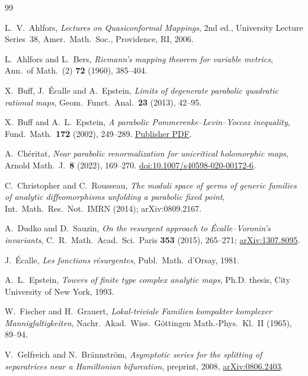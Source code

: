 \documentclass[11pt]{amsart}
\theoremstyle{definition}
\begin{document}
\begin{thebibliography}{99}

L.~V.~Ahlfors,
\emph{Lectures on Quasiconformal Mappings}, 2nd ed.,
University Lecture Series~38, Amer.\ Math.\ Soc., Providence, RI, 2006.

L.~Ahlfors and L.~Bers,
\emph{Riemann's mapping theorem for variable metrics},
Ann.\ of Math.\ (2) \textbf{72} (1960), 385--404.

X.~Buff, J.~\'Ecalle and A.~Epstein,
\emph{Limits of degenerate parabolic quadratic rational maps},
Geom.\ Funct.\ Anal.\ \textbf{23} (2013), 42--95.

X.~Buff and A.~L.~Epstein,
\emph{A parabolic Pommerenke--Levin--Yoccoz inequality},
Fund.\ Math.\ \textbf{172} (2002), 249--289.
\href{https://www.impan.pl/shop/en/publication/transaction/download/product/89261}{Publisher PDF}.

A.~Ch\'eritat,
\emph{Near parabolic renormalization for unicritical holomorphic maps},
Arnold Math.\ J.\ \textbf{8} (2022), 169--270.
\href{https://doi.org/10.1007/s40598-020-00172-6}{doi:10.1007/s40598-020-00172-6}.

C.~Christopher and C.~Rousseau,
\emph{The moduli space of germs of generic families of analytic
diffeomorphisms unfolding a parabolic fixed point},
Int.\ Math.\ Res.\ Not.\ IMRN (2014); arXiv:0809.2167.

A.~Dudko and D.~Sauzin,
\emph{On the resurgent approach to \'Ecalle--Voronin's invariants},
C.\ R.\ Math.\ Acad.\ Sci.\ Paris \textbf{353} (2015), 265--271;
\href{https://arxiv.org/abs/1307.8095}{arXiv:1307.8095}.

J.~\'Ecalle,
\emph{Les fonctions r\'esurgentes}, Publ.\ Math.\ d'Orsay, 1981.

A.~L.~Epstein,
\emph{Towers of finite type complex analytic maps},
Ph.D. thesis, City University of New York, 1993.

W.~Fischer and H.~Grauert,
\emph{Lokal-triviale Familien kompakter komplexer Mannigfaltigkeiten},
Nachr.\ Akad.\ Wiss.\ G\"ottingen Math.-Phys.\ Kl.\ II (1965), 89--94.

V.~Gelfreich and N.~Br\"annstr\"om,
\emph{Asymptotic series for the splitting of separatrices near a Hamiltonian
bifurcation}, preprint, 2008,
\href{https://arxiv.org/abs/0806.2403}{arXiv:0806.2403}.


\end{thebibliography}
\end{document}
